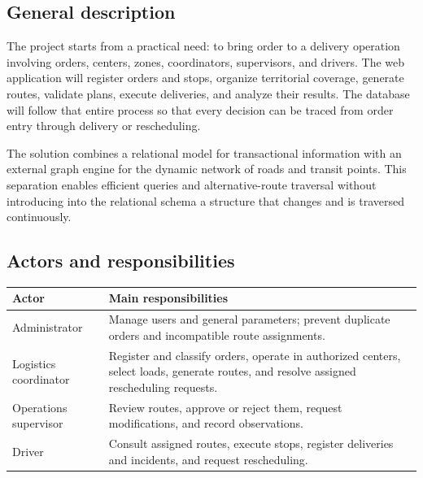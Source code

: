 \documentclass[12pt,a4paper]{article}
\begin{document}
\subsection{General description}
The project starts from a practical need: to bring order to a delivery operation involving orders, centers, zones, coordinators, supervisors, and drivers. The web application will register orders and stops, organize territorial coverage, generate routes, validate plans, execute deliveries, and analyze their results. The database will follow that entire process so that every decision can be traced from order entry through delivery or rescheduling.

The solution combines a relational model for transactional information with an external graph engine for the dynamic network of roads and transit points. This separation enables efficient queries and alternative-route traversal without introducing into the relational schema a structure that changes and is traversed continuously.

\subsection{Actors and responsibilities}
\begin{longtable}{p{}p{}}
\toprule
\textbf{Actor} & \textbf{Main responsibilities}\\
\midrule
Administrator & Manage users and general parameters; prevent duplicate orders and incompatible route assignments.\\
Logistics coordinator & Register and classify orders, operate in authorized centers, select loads, generate routes, and resolve assigned rescheduling requests.\\
Operations supervisor & Review routes, approve or reject them, request modifications, and record observations.\\
Driver & Consult assigned routes, execute stops, register deliveries and incidents, and request rescheduling.\\
\bottomrule
\end{longtable}
\end{document}
